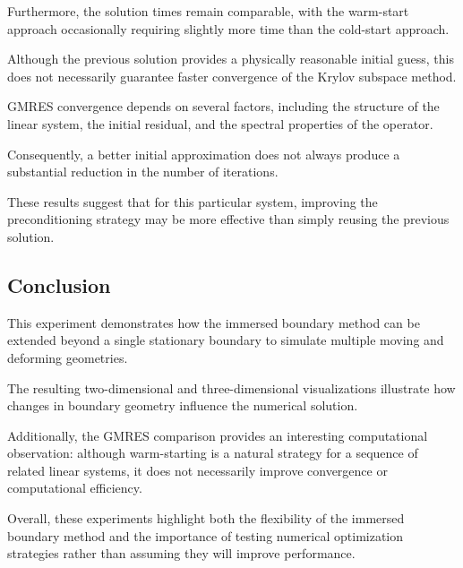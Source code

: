 \documentclass[11pt]{article}
\begin{document}
Furthermore, the solution times remain
comparable, with the warm-start approach
occasionally requiring slightly more time
than the cold-start approach.

Although the previous solution provides
a physically reasonable initial guess,
this does not necessarily guarantee faster
convergence of the Krylov subspace method.

GMRES convergence depends on several factors,
including the structure of the linear system,
the initial residual, and the spectral
properties of the operator.

Consequently, a better initial approximation
does not always produce a substantial reduction
in the number of iterations.

These results suggest that for this particular
system, improving the preconditioning strategy
may be more effective than simply reusing
the previous solution.


\subsection*{Conclusion}

This experiment demonstrates how the immersed
boundary method can be extended beyond a
single stationary boundary to simulate
multiple moving and deforming geometries.

The resulting two-dimensional and
three-dimensional visualizations illustrate
how changes in boundary geometry influence
the numerical solution.

Additionally, the GMRES comparison provides
an interesting computational observation:
although warm-starting is a natural strategy
for a sequence of related linear systems,
it does not necessarily improve convergence
or computational efficiency.

Overall, these experiments highlight both
the flexibility of the immersed boundary
method and the importance of testing
numerical optimization strategies rather
than assuming they will improve performance.
\end{document}
